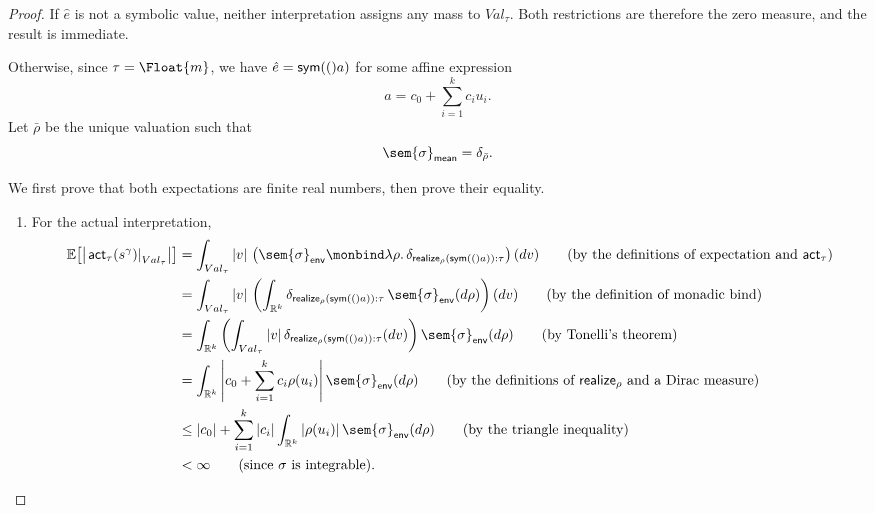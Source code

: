 \begin{proof}
  If $\hat e$ is not a symbolic value, neither interpretation assigns any mass to
  $Val_\tau$. Both restrictions are therefore the zero measure, and
  the result is immediate.

  Otherwise, since $\tau=\Float{m}$, we have $\hat e=\mathsf{sym}(()a)$ for
  some affine expression
  \[
    a=c_0+\sum_{i=1}^k c_i u_i.
  \]
  Let $\bar\rho$ be the unique valuation such that
  \[
    \sem{\sigma}_{\mathsf{mean}}=\delta_{\bar\rho}.
  \]

  We first prove that both expectations are finite real numbers, then prove
  their equality.

  \begin{enumerate}
    \item
    For the actual interpretation,
    \begin{align}
      \mathbb E\!\left[
        \left|
          \left.\mathsf{act}_\tau(s^\gamma)\right|_{Val_\tau}
        \right|
      \right]
      &=
      \int_{Val_\tau}
        |v|\,
        \left(
          \sem{\sigma}_{\mathsf{env}}
          \monbind
          \lambda\rho.\,
          \delta_{\mathsf{realize}_\rho(\sym(a)):\tau}
        \right)(dv)
      \tag{\text{by the definitions of expectation and $\mathsf{act}_\tau$}}
      \\
      &=
      \int_{Val_\tau}
        |v|\,
        \left(
          \int_{\mathbb R^k}
            \delta_{\mathsf{realize}_\rho(\sym(a)):\tau}
            \,\sem{\sigma}_{\mathsf{env}}(d\rho)
        \right)(dv)
      \tag{\text{by the definition of monadic bind}}
      \\
      &=
      \int_{\mathbb R^k}
        \left(
          \int_{Val_\tau}
            |v|\,
            \delta_{\mathsf{realize}_\rho(\sym(a)):\tau}(dv)
        \right)
        \sem{\sigma}_{\mathsf{env}}(d\rho)
      \tag{\text{by Tonelli's theorem}}
      \\
      &=
      \int_{\mathbb R^k}
        \left|
          c_0+\sum_{i=1}^k c_i\rho(u_i)
        \right|
        \sem{\sigma}_{\mathsf{env}}(d\rho)
      \tag{\text{by the definitions of $\mathsf{realize}_\rho$ and a Dirac measure}}
      \\
      &\leq
      |c_0|
      +
      \sum_{i=1}^k
        |c_i|
        \int_{\mathbb R^k}
          |\rho(u_i)|\,
          \sem{\sigma}_{\mathsf{env}}(d\rho)
      \tag{\text{by the triangle inequality}}
      \\
      &<
      \infty
      \tag{\text{since $\sigma$ is integrable}}.
    \end{align}


\end{enumerate}
\end{proof}
